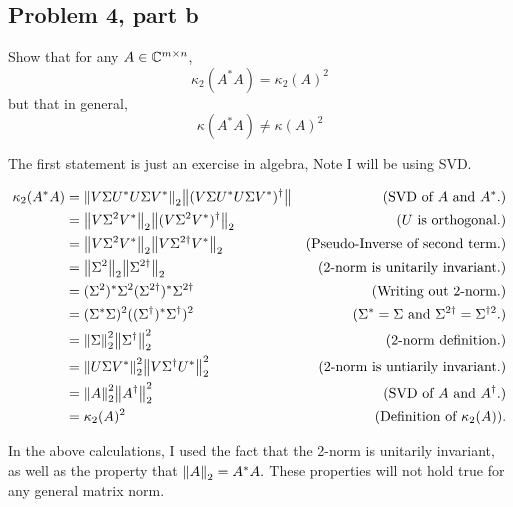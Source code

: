 \subsection{Problem 4, part b}
Show that for any $A \in \mathbb{C}^{m\times n}$,
\[
    \kappa_2(A^*A) = \kappa_2(A)^2
\]
but that in general,
\[
    \kappa(A^*A)\neq \kappa(A)^2
\]
\partbreak
\begin{solution}

 The first statement is just an exercise in algebra, Note I will be using SVD. 

 \alignbreak
 \begin{align*}
     \kappa_2(A^*A) &= \norm{V\Sigma U^* U\Sigma V^*}_2 \norm{(V\Sigma U^* U\Sigma V^*)^\dag} &\text{(SVD of $A$ and $A^*$.)}\nonumber\\
     &= \norm{V\Sigma^2V^*}_2 \norm{(V\Sigma ^2V^*)^\dag}_2 &\text{($U$ is orthogonal.)}\nonumber\\
     &= \norm{V\Sigma^2 V^*}_2 \norm{V\Sigma^{2\dag}V^*}_2 &\text{(Pseudo-Inverse of second term.)}\nonumber\\
     &= \norm{\Sigma^2}_2 \norm{\Sigma^{2\dag}}_2 &\text{(2-norm is unitarily invariant.)}\nonumber\\
     &= (\Sigma^2)^*\Sigma^2 (\Sigma^{2\dag})^*\Sigma^{2\dag} &\text{(Writing out 2-norm.)}\nonumber\\
     &= (\Sigma^*\Sigma)^2 ((\Sigma^\dag)^* \Sigma^\dag)^2 &\text{($\Sigma^* = \Sigma$ and $\Sigma^{2\dag} = \Sigma^{\dag 2}$.)}\nonumber\\
     &= \norm{\Sigma}_2^2\norm{\Sigma^\dag}_2^2 &\text{(2-norm definition.)}\nonumber\\
     &= \norm{U\Sigma V^*}^2_2\norm{V\Sigma^\dag U^*}_2^2 &\text{(2-norm is untiarily invariant.)}\nonumber\\
     &= \norm{A}_2^2\norm{A^\dag}_2^2 &\text{(SVD of $A$ and $A^\dag$.)}\nonumber\\
     &= \kappa_2(A)^2 &\text{(Definition of $\kappa_2(A)$).}\nonumber
 \end{align*}
 \alignbreak

 In the above calculations, I used the fact that the 2-norm is unitarily invariant, as well as the property that $\norm{A}_2 = A^*A.$ These properties will not hold true for any general matrix norm.  
\end{solution}

\newpage
